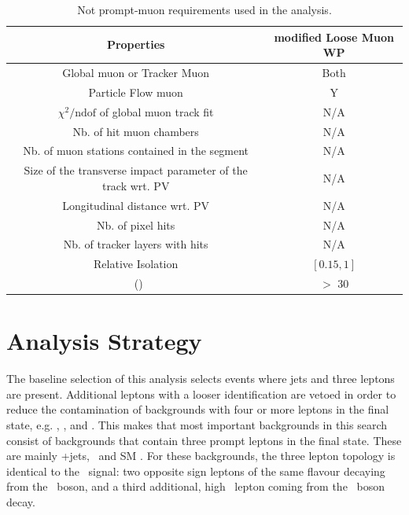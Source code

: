 \begin{table}[htbp]
	\centering
	\caption{Not prompt-muon requirements used in the analysis. }
	
	\begin{tabular}{cc}
		\toprule
	 Properties	& modified Loose Muon WP \\ 
		\midrule 
		Global muon or Tracker Muon & Both  \\ 
		
		Particle Flow muon & Y  \\ 
		
		$\chi^2/\mathrm{ndof}$ of global muon track fit & N/A \\  
		
		Nb. of hit muon chambers & N/A \\ 
		 
		Nb. of muon stations contained in the segment & N/A   \\ 
		
		Size of the transverse impact parameter  of the track wrt. PV & N/A  \\ 
		 
		Longitudinal distance wrt. PV & N/A \\ 
		
		Nb. of pixel hits & N/A \\ 
		
		Nb. of tracker layers with hits & N/A  \\ 
		
		Relative Isolation & $\left[0.15,1\right]$ \\
		
		\pt\ (\GeV) &$>$ 30  \\
		\bottomrule
	\end{tabular} 
	
	\label{tab:nonpromptmu}
\end{table}


\newpage
\section{Analysis Strategy}
\label{sec:regions}

The baseline selection of this analysis selects events where jets and three leptons are present. Additional leptons with a looser identification are vetoed in order to reduce the contamination of backgrounds with four or more leptons in the final state, e.g. \ZZ, \ttZ, and \ttH. This makes that most important backgrounds in this search consist of backgrounds  that contain three prompt leptons in the final state. These are mainly \WZ +jets, \ttZ\ and SM \tZq. For these backgrounds, the three lepton topology is identical to the \FCNC\ signal: two opposite sign leptons of the same flavour decaying from the \PZ\ boson, and a third additional, high \pt\ lepton coming from the \PW\ boson decay.

